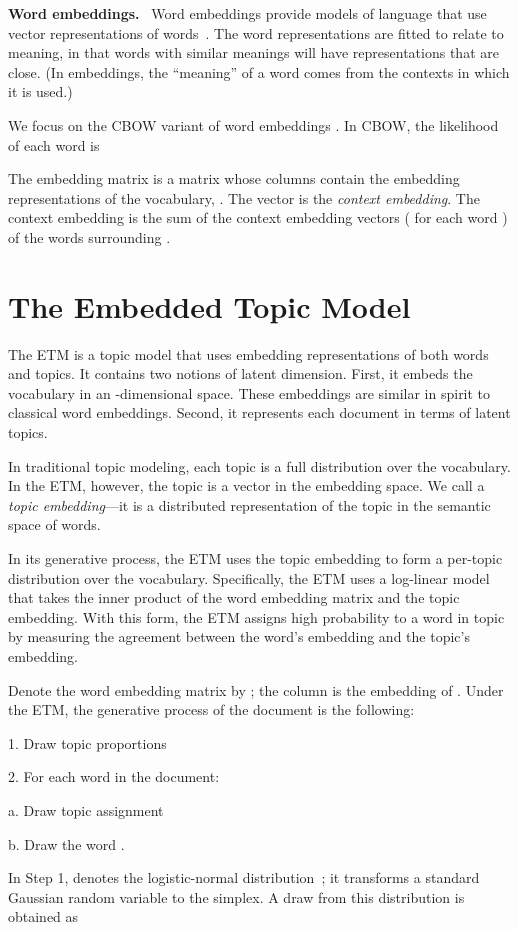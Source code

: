 \documentclass[11pt,a4paper]{article}
\DeclareRobustCommand{\parhead}[1]{\noindent\textbf{#1}~}
\begin{document}
\parhead{Word embeddings.}  Word embeddings provide models of language
that use vector representations of
words~\citep{Rumelhart:1973,Bengio:2003}. The word representations are
fitted to relate to meaning, in that words with similar meanings will
have representations that are close.  (In embeddings, the ``meaning''
of a word comes from the contexts in which it is used.)


We focus on the \gls{CBOW} variant of word embeddings
\citep{mikolov2013distributed}. In \gls{CBOW}, the likelihood of each
word  is

The embedding matrix  is a  matrix whose columns
contain the embedding representations of the vocabulary,
. The vector  is the \emph{context
  embedding}. The context embedding is the sum of the context
embedding vectors ( for each word ) of the words surrounding
.

 
\section{The Embedded Topic Model}
\label{sec:model}

The \gls{ETM} is a topic model that uses embedding representations of
both words and topics.  It contains two notions of latent
dimension. First, it embeds the vocabulary in an -dimensional
space.  These embeddings are similar in spirit to classical word
embeddings.  Second, it represents each document in terms of 
latent topics.

In traditional topic modeling, each topic is a full distribution over
the vocabulary. In the \gls{ETM}, however, the  topic is a vector
 in the embedding space. We call  a
\emph{topic embedding}---it is a distributed representation of the
 topic in the semantic space of words.

In its generative process, the \gls{ETM} uses the topic embedding to
form a per-topic distribution over the vocabulary. Specifically, the
\gls{ETM} uses a log-linear model that takes the inner product of the
word embedding matrix and the topic embedding.  With this form, the
\gls{ETM} assigns high probability to a word  in topic  by
measuring the agreement between the word's embedding and the topic's
embedding.

Denote the  word embedding matrix by ; the column
 is the embedding of .  Under the \gls{ETM}, the generative
process of the  document is the following:
\begin{compactitem}
\item[1.] Draw topic proportions 
\item[2.] For each word  in the document:
  \begin{compactitem}
    \setlength{\itemindent}{-0.3cm}
  \item[a.] Draw topic assignment 
  \item[b.] Draw the word .
  \end{compactitem}
\end{compactitem}
In Step 1,  denotes the logistic-normal
distribution~\citep{Aitchison:1980,blei2007correlated}; it transforms
a standard Gaussian random variable to the simplex. A draw 
from this distribution is obtained as
\end{document}
